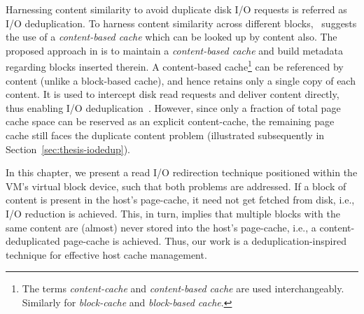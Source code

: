 Harnessing content similarity 
to avoid duplicate disk I/O requests %
is referred as I/O deduplication.
To harness content similarity across different blocks,~\cite{iodedup} 
suggests the use of a 
\textit{content-based cache} which can be looked up by content also.
The proposed approach in \cite{iodedup} is to
maintain a \textit{content-based cache} and build 
metadata 
regarding blocks inserted therein. 
A content-based cache\footnote{The terms 
\textit{content-cache} and \textit{content-based cache} are used 
interchangeably. Similarly for \textit{block-cache} and 
\textit{block-based cache}.}
can be referenced by content 
(unlike a block-based cache), and hence 
retains only a single copy of each content. 
It is used to intercept disk read
requests and deliver content directly, 
thus enabling I/O deduplication~\cite{iodedup}.
However, since only a fraction of total page cache space can be reserved
as an explicit content-cache, the remaining page cache still faces the
duplicate content problem (illustrated 
subsequently in Section~\ref{sec:thesis-iodedup}).


In this chapter, we present a read I/O redirection technique positioned within
the VM's virtual block device, such that both problems are 
addressed. If a block of content is present in the host's page-cache,
it need not get fetched from disk, i.e., I/O reduction is 
achieved. This, in turn, implies that multiple blocks with the same content 
are (almost) never stored into the host's page-cache, i.e., 
a content-deduplicated page-cache is achieved. 
Thus, our work is a deduplication-inspired technique for effective host
cache management.

